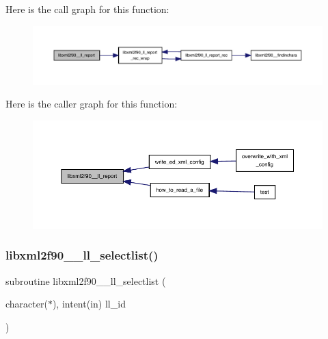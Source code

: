 Here is the call graph for this function\+:
\nopagebreak
\begin{figure}[H]
\begin{center}
\leavevmode
\includegraphics[width=350pt]{libxml2f90_8f90__pp_8f90_a82abdf47d88bfca1f54ddd7fb0ca71f2_cgraph}
\end{center}
\end{figure}
Here is the caller graph for this function\+:
\nopagebreak
\begin{figure}[H]
\begin{center}
\leavevmode
\includegraphics[width=350pt]{libxml2f90_8f90__pp_8f90_a82abdf47d88bfca1f54ddd7fb0ca71f2_icgraph}
\end{center}
\end{figure}
\mbox{\label{libxml2f90_8f90__pp_8f90_aa648c34edeb1a504525200e1aed59f18}} 
\subsubsection{\texorpdfstring{libxml2f90\+\_\+\+\_\+ll\+\_\+selectlist()}{libxml2f90\_\_ll\_selectlist()}}
{\footnotesize\ttfamily subroutine libxml2f90\+\_\+\+\_\+ll\+\_\+selectlist (\begin{DoxyParamCaption}\item[{character($\ast$), intent(in)}]{ll\+\_\+id }\end{DoxyParamCaption})}

